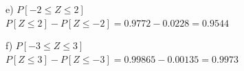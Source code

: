 \documentclass[a4paper, 12pt]{article}
\newcommand{\Aspace}{0.2cm}
\begin{document}
\begin{enumerate}
            \vspace{\Aspace} \par
            e) $P[-2 \leq Z \leq 2]$
            \vspace{\Aspace}
            \\ { \color{azul} $P[Z \leq 2] - P[Z \leq -2] = 0{.}9772 - 0{.}0228 = 0{.}9544$}

            \vspace{\Aspace} \par
            f) $P[-3 \leq Z \leq 3]$
            \vspace{\Aspace}
            \\ { \color{azul} $P[Z \leq 3] - P[Z \leq -3] = 0{.}99865 - 0{.}00135 = 0{.}9973$ }
    \end{enumerate}
\end{document}
